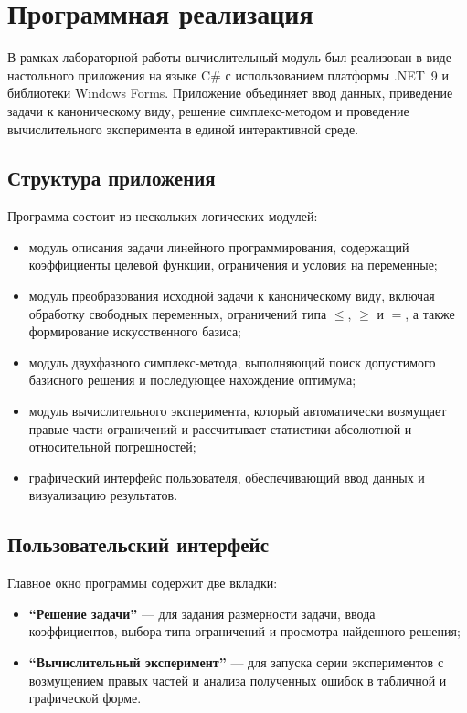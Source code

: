 \section{Программная реализация}

В рамках лабораторной работы вычислительный модуль был реализован в виде настольного приложения на языке C\# с использованием платформы .NET~9 и библиотеки Windows Forms. Приложение объединяет ввод данных, приведение задачи к каноническому виду, решение симплекс-методом и проведение вычислительного эксперимента в единой интерактивной среде.

\subsection{Структура приложения}

Программа состоит из нескольких логических модулей:

\begin{itemize}
    \item модуль описания задачи линейного программирования, содержащий коэффициенты целевой функции, ограничения и условия на переменные;
    \item модуль преобразования исходной задачи к каноническому виду, включая обработку свободных переменных, ограничений типа $\leq$, $\geq$ и $=$, а также формирование искусственного базиса;
    \item модуль двухфазного симплекс-метода, выполняющий поиск допустимого базисного решения и последующее нахождение оптимума;
    \item модуль вычислительного эксперимента, который автоматически возмущает правые части ограничений и рассчитывает статистики абсолютной и относительной погрешностей;
    \item графический интерфейс пользователя, обеспечивающий ввод данных и визуализацию результатов.
\end{itemize}

\subsection{Пользовательский интерфейс}

Главное окно программы содержит две вкладки:

\begin{itemize}
    \item \textbf{``Решение задачи''} --- для задания размерности задачи, ввода коэффициентов, выбора типа ограничений и просмотра найденного решения;
    \item \textbf{``Вычислительный эксперимент''} --- для запуска серии экспериментов с возмущением правых частей и анализа полученных ошибок в табличной и графической форме.
\end{itemize}

